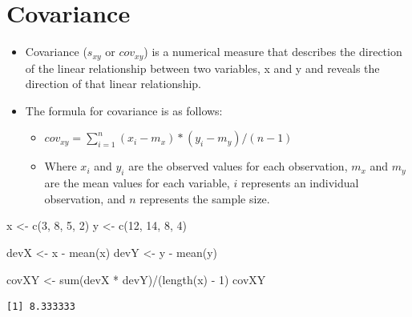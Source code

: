 \documentclass[
  letterpaper,
  DIV=11,
  numbers=noendperiod]{scrreprt}
\newenvironment{Shaded}{\begin{snugshade}}{\end{snugshade}}
\newcommand{\DecValTok}[1]{\textcolor[rgb]{0.68,0.00,0.00}{#1}}
\newcommand{\FunctionTok}[1]{\textcolor[rgb]{0.28,0.35,0.67}{#1}}
\newcommand{\NormalTok}[1]{\textcolor[rgb]{0.00,0.23,0.31}{#1}}
\newcommand{\OtherTok}[1]{\textcolor[rgb]{0.00,0.23,0.31}{#1}}
\newcommand{\SpecialCharTok}[1]{\textcolor[rgb]{0.37,0.37,0.37}{#1}}
\providecommand{\tightlist}{%
  \setlength{\itemsep}{0pt}\setlength{\parskip}{0pt}}\usepackage{longtable,booktabs,array}
\begin{document}
\section{Covariance}\label{covariance}

\begin{itemize}
\tightlist
\item
  Covariance (\(s_{xy}\) or \(cov_{xy}\)) is a numerical measure that
  describes the direction of the linear relationship between two
  variables, x and y and reveals the direction of that linear
  relationship.
\item
  The formula for covariance is as follows:

  \begin{itemize}
  \tightlist
  \item
    \(cov_{xy} = \sum^n_{i=1}(x_i-m_x)*(y_i-m_y)/(n-1)\)
  \item
    Where \(x_i\) and \(y_i\) are the observed values for each
    observation, \(m_x\) and \(m_y\) are the mean values for each
    variable, \(i\) represents an individual observation, and \(n\)
    represents the sample size.
  \end{itemize}
\end{itemize}

\begin{Shaded}
\begin{Highlighting}[]
\NormalTok{x }\OtherTok{\textless{}{-}} \FunctionTok{c}\NormalTok{(}\DecValTok{3}\NormalTok{, }\DecValTok{8}\NormalTok{, }\DecValTok{5}\NormalTok{, }\DecValTok{2}\NormalTok{)}
\NormalTok{y }\OtherTok{\textless{}{-}} \FunctionTok{c}\NormalTok{(}\DecValTok{12}\NormalTok{, }\DecValTok{14}\NormalTok{, }\DecValTok{8}\NormalTok{, }\DecValTok{4}\NormalTok{)}

\NormalTok{devX }\OtherTok{\textless{}{-}}\NormalTok{ x }\SpecialCharTok{{-}} \FunctionTok{mean}\NormalTok{(x)}
\NormalTok{devY }\OtherTok{\textless{}{-}}\NormalTok{ y }\SpecialCharTok{{-}} \FunctionTok{mean}\NormalTok{(y)}

\NormalTok{covXY }\OtherTok{\textless{}{-}} \FunctionTok{sum}\NormalTok{(devX }\SpecialCharTok{*}\NormalTok{ devY)}\SpecialCharTok{/}\NormalTok{(}\FunctionTok{length}\NormalTok{(x) }\SpecialCharTok{{-}} \DecValTok{1}\NormalTok{)}
\NormalTok{covXY}
\end{Highlighting}
\end{Shaded}

\begin{verbatim}
[1] 8.333333
\end{verbatim}
\end{document}
